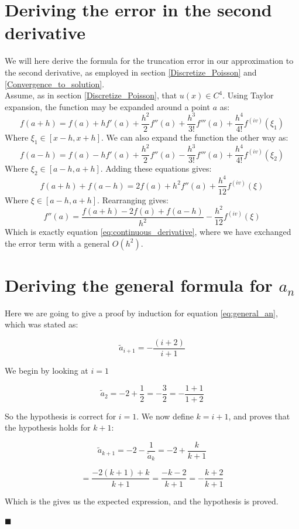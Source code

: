\documentclass[a4paper, 10pt]{article}
\begin{document}
\newpage
\begin{appendices}
\section{Deriving the error in the second derivative}\label{appendix_A}
We will here derive the formula for the truncation error in our approximation to the second derivative, as employed in section \ref{Discretize_Poisson} and \ref{Convergence_to_solution}.\\
\linebreak
Assume, as in section \ref{Discretize_Poisson}, that $u(x) \in C^4$. Using Taylor expansion, the function may be expanded around a point $a$ as:
$$f(a+h) = f(a)+hf'(a)+\frac{h^2}{2}f''(a)+\frac{h^3}{3!}f'''(a)+\frac{h^4}{4!}f^{(iv)}(\xi_1)$$
Where $\xi_1 \in [x-h, x+h]$. We can also expand the function the other way as:
$$f(a-h) = f(a)-hf'(a)+\frac{h^2}{2}f''(a)-\frac{h^3}{3!}f'''(a)+\frac{h^4}{4!}f^{(iv)}(\xi_2)$$
Where $\xi_2 \in [a-h, a+h]$. Adding these equations gives:
$$f(a+h)+f(a-h)=2f(a)+h^2f''(a)+\frac{h^4}{12}f^{(iv)}(\xi)$$
Where $\xi \in [a-h, a+h]$. Rearranging gives:
$$f''(a)=\frac{f(a+h)-2f(a)+f(a-h)}{h^2}-\frac{h^2}{12}f^{(iv)}(\xi)$$
Which is exactly equation \ref{eq:continuous_derivative}, where we have exchanged the error term with a general $O(h^2)$.
\section{Deriving the general formula for $a_n$}\label{appendix_B}
Here we are going to give a proof by induction for equation \ref{eq:general_an}, which was stated as:

$$
\tilde{a}_{i+1}=-\frac{(i+2)}{i+1}
$$


We begin by looking at $i=1$

$$
\tilde{a}_{2} = -2 + \frac{1}{2} = -\frac{3}{2} = -\frac{1+1}{1+2}
$$

So the hypothesis is correct for $i = 1$. We now define $k = i+1$, and proves that the hypothesis holds for $k+1$:

$$
\tilde{a}_{k+1} = -2 - \frac{1}{\tilde{a}_{k}} = -2 + \frac{k}{k+1}
$$

$$
= \frac{-2(k+1) + k}{k+1} = \frac{-k - 2}{k+1} = -\frac{k+2}{k+1}
$$

Which is the gives us the expected expression, and the hypothesis is proved.


\hfill $\blacksquare$
\end{appendices}
\end{document}
